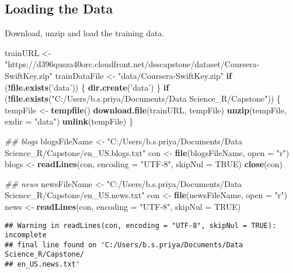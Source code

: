 \documentclass[]{article}
\newenvironment{Shaded}{\begin{snugshade}}{\end{snugshade}}
\newcommand{\CommentTok}[1]{\textcolor[rgb]{0.56,0.35,0.01}{\textit{#1}}}
\newcommand{\ControlFlowTok}[1]{\textcolor[rgb]{0.13,0.29,0.53}{\textbf{#1}}}
\newcommand{\DataTypeTok}[1]{\textcolor[rgb]{0.13,0.29,0.53}{#1}}
\newcommand{\KeywordTok}[1]{\textcolor[rgb]{0.13,0.29,0.53}{\textbf{#1}}}
\newcommand{\NormalTok}[1]{#1}
\newcommand{\OperatorTok}[1]{\textcolor[rgb]{0.81,0.36,0.00}{\textbf{#1}}}
\newcommand{\OtherTok}[1]{\textcolor[rgb]{0.56,0.35,0.01}{#1}}
\newcommand{\StringTok}[1]{\textcolor[rgb]{0.31,0.60,0.02}{#1}}
\begin{document}
\hypertarget{loading-the-data}{%
\subsection{Loading the Data}\label{loading-the-data}}

Download, unzip and load the training data.

\begin{Shaded}
\begin{Highlighting}[]
\NormalTok{trainURL <-}\StringTok{ "https://d396qusza40orc.cloudfront.net/dsscapstone/dataset/Coursera-SwiftKey.zip"}
\NormalTok{trainDataFile <-}\StringTok{ "data/Coursera-SwiftKey.zip"}
\ControlFlowTok{if}\NormalTok{ (}\OperatorTok{!}\KeywordTok{file.exists}\NormalTok{(}\StringTok{'data'}\NormalTok{)) \{}
  \KeywordTok{dir.create}\NormalTok{(}\StringTok{'data'}\NormalTok{)}
\NormalTok{\}}
\ControlFlowTok{if}\NormalTok{ (}\OperatorTok{!}\KeywordTok{file.exists}\NormalTok{(}\StringTok{"C:/Users/b.s.priya/Documents/Data Science_R/Capstone"}\NormalTok{)) \{}
\NormalTok{  tempFile <-}\StringTok{ }\KeywordTok{tempfile}\NormalTok{()}
  \KeywordTok{download.file}\NormalTok{(trainURL, tempFile)}
  \KeywordTok{unzip}\NormalTok{(tempFile, }\DataTypeTok{exdir =} \StringTok{"data"}\NormalTok{)}
  \KeywordTok{unlink}\NormalTok{(tempFile)}
\NormalTok{\}}

\CommentTok{## blogs}
\NormalTok{blogsFileName <-}\StringTok{ "C:/Users/b.s.priya/Documents/Data Science_R/Capstone/en_US.blogs.txt"}
\NormalTok{con <-}\StringTok{ }\KeywordTok{file}\NormalTok{(blogsFileName, }\DataTypeTok{open =} \StringTok{"r"}\NormalTok{)}
\NormalTok{blogs <-}\StringTok{ }\KeywordTok{readLines}\NormalTok{(con, }\DataTypeTok{encoding =} \StringTok{"UTF-8"}\NormalTok{, }\DataTypeTok{skipNul =} \OtherTok{TRUE}\NormalTok{)}
\KeywordTok{close}\NormalTok{(con)}

\CommentTok{## news}
\NormalTok{newsFileName <-}\StringTok{ "C:/Users/b.s.priya/Documents/Data Science_R/Capstone/en_US.news.txt"}
\NormalTok{con <-}\StringTok{ }\KeywordTok{file}\NormalTok{(newsFileName, }\DataTypeTok{open =} \StringTok{"r"}\NormalTok{)}
\NormalTok{news <-}\StringTok{ }\KeywordTok{readLines}\NormalTok{(con, }\DataTypeTok{encoding =} \StringTok{"UTF-8"}\NormalTok{, }\DataTypeTok{skipNul =} \OtherTok{TRUE}\NormalTok{)}
\end{Highlighting}
\end{Shaded}

\begin{verbatim}
## Warning in readLines(con, encoding = "UTF-8", skipNul = TRUE): incomplete
## final line found on 'C:/Users/b.s.priya/Documents/Data Science_R/Capstone/
## en_US.news.txt'
\end{verbatim}
\end{document}
